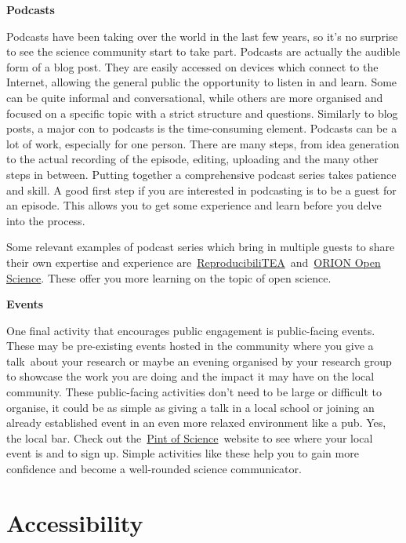 \documentclass[
]{book}
\begin{document}
\textbf{Podcasts}

Podcasts have been taking over the world in the last few years, so it's no surprise to see the science community start to take part. Podcasts are actually the audible form of a blog post. They are easily accessed on devices which connect to the Internet, allowing the general public the opportunity to listen in and learn. Some can be quite informal and conversational, while others are more organised and focused on a specific topic with a strict structure and questions. Similarly to blog posts, a major con to podcasts is the time-consuming element. Podcasts can be a lot of work, especially for one person. There are many steps, from idea generation to the actual recording of the episode, editing, uploading and the many other steps in between. Putting together a comprehensive podcast series takes patience and skill. A good first step if you are interested in podcasting is to be a guest for an episode. This allows you to get some experience and learn before you delve into the process.

Some relevant examples of podcast series which bring in multiple guests to share their own expertise and experience are~\href{https://soundcloud.com/reproducibilitea}{ReproducibiliTEA}~and~\href{https://www.orion-openscience.eu/publications/training-materials/201902/podcasts}{ORION Open Science}. These offer you more learning on the topic of open science.

\textbf{Events}

One final activity that encourages public engagement is public-facing events. These may be pre-existing events hosted in the community where you give a talk~about your research or maybe an evening organised by your research group to showcase the work you are doing and the impact it may have on the local community. These public-facing activities don't need to be large or difficult to organise, it could be as simple as giving a talk in a local school or joining an already established event in an even more relaxed environment like a pub. Yes, the local bar. Check out the~\href{https://pintofscience.com/}{Pint of Science}~website to see where your local event is and to sign up. Simple activities like these help you to gain more confidence and become a well-rounded science communicator.

\hypertarget{accessibility}{%
\section{\texorpdfstring{\textbf{Accessibility}}{Accessibility}}\label{accessibility}}
\end{document}
